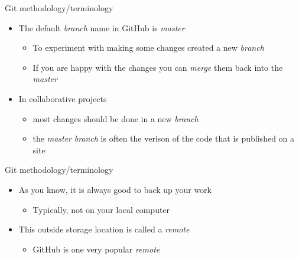 \documentclass[
  ignorenonframetext,
]{beamer}
\providecommand{\tightlist}{%
  \setlength{\itemsep}{0pt}\setlength{\parskip}{0pt}}
\begin{document}
\begin{frame}{Git methodology/terminology}
\protect\hypertarget{git-methodologyterminology-6}{}

\begin{itemize}
\tightlist
\item
  The default \emph{branch} name in GitHub is \emph{master}

  \begin{itemize}
  \tightlist
  \item
    To experiment with making some changes created a new \emph{branch}
  \item
    If you are happy with the changes you can \emph{merge} them back
    into the \emph{master}
  \end{itemize}
\item
  In collaborative projects

  \begin{itemize}
  \tightlist
  \item
    most changes should be done in a new \emph{branch}
  \item
    the \emph{master} \emph{branch} is often the verison of the code
    that is published on a site
  \end{itemize}
\end{itemize}

\end{frame}

\begin{frame}{Git methodology/terminology}
\protect\hypertarget{git-methodologyterminology-7}{}

\begin{itemize}
\tightlist
\item
  As you know, it is always good to back up your work

  \begin{itemize}
  \tightlist
  \item
    Typically, not on your local computer
  \end{itemize}
\item
  This outside storage location is called a \emph{remote}

  \begin{itemize}
  \tightlist
  \item
    GitHub is one very popular \emph{remote}
  \end{itemize}
\end{itemize}

\end{frame}
\end{document}
